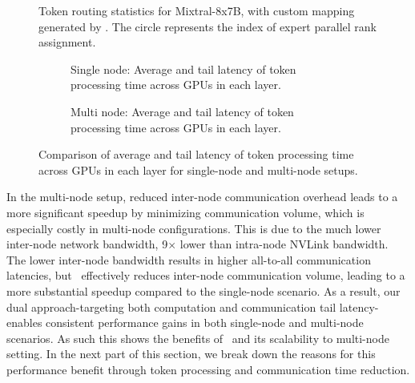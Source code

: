 \begin{figure}
    \centering
    
    \vspace{-1em}
    \caption{Token routing statistics for Mixtral-8x7B, with custom mapping generated by \expertune. The circle represents the index of expert parallel rank assignment.}
    \label{fig:mapping}
\end{figure}


\begin{figure}
    \centering
    \begin{subfigure}[b]{\linewidth}
        \centering
        \vspace{-1.8em}
        \caption{Single node: Average and tail latency of token processing time across GPUs in each layer.}
        \vspace{0.5em}
        \label{fig:tail-latency-computation-1node}
    \end{subfigure}
    \begin{subfigure}[b]{\linewidth}
        \centering
        \vspace{-1.8em}
        \caption{Multi node: Average and tail latency of token processing time across GPUs in each layer.}
        \label{fig:tail-latency-computation-2nodes}
    \end{subfigure}
    \vspace{-2em}
    \caption{Comparison of average and tail latency of token processing time across GPUs in each layer for single-node and multi-node setups.}
    \label{fig:compute-tail-latency-comparison}
\end{figure}



In the multi-node setup, reduced inter-node communication overhead leads to a more significant speedup by minimizing communication volume, which is especially costly in multi-node configurations.
%
This is due to the much lower inter-node network bandwidth, 9$\times$ lower than intra-node NVLink bandwidth.
%
The lower inter-node bandwidth results in higher all-to-all communication latencies, but \expertune~effectively reduces inter-node communication volume, leading to a more substantial speedup compared to the single-node scenario.
%
As a result, our dual approach-targeting both computation and communication tail latency-enables consistent performance gains in both single-node and multi-node scenarios.
%
As such this shows the benefits of \expertune~and its scalability to multi-node setting.
%
In the next part of this section, we break down the reasons for this performance benefit through token processing and communication time reduction.



